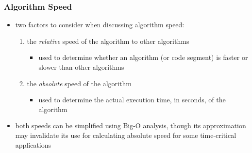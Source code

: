 \documentclass[11pt]{article}
\begin{document}
\subsubsection{Algorithm Speed}
\label{sec:org9ec8c31}
\begin{itemize}
\item two factors to consider when discussing algorithm speed:
\begin{enumerate}
\item the \emph{relative} speed of the algorithm to other algorithms
\begin{itemize}
\item used to determine whether an algorithm (or code segment) is faster or slower than other algorithms
\end{itemize}
\item the \emph{absolute} speed of the algorithm
\begin{itemize}
\item used to determine the actual execution time, in seconds, of the algorithm
\end{itemize}
\end{enumerate}
\item both speeds can be simplified using Big-O analysis, though its approximation may invalidate its use for calculating absolute speed for some time-critical applications
\end{itemize}
\end{document}
